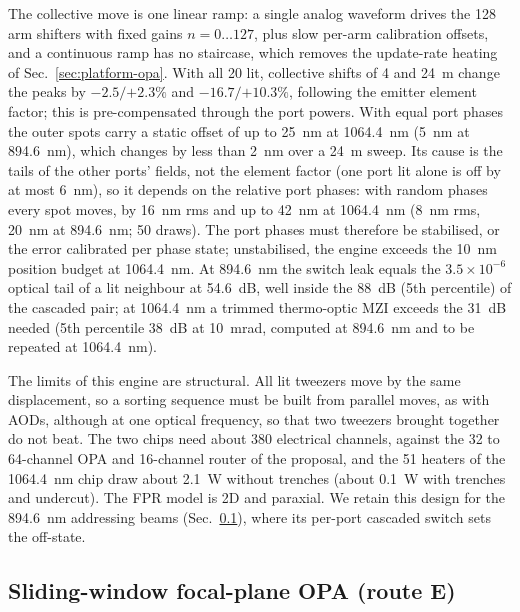 The collective move is one linear ramp: a single analog waveform drives the 128 arm shifters with fixed gains $n = 0\dots127$, plus slow per-arm calibration offsets, and a continuous ramp has no staircase, which removes the update-rate heating of Sec.~\ref{sec:platform-opa}. With all 20 lit, collective shifts of 4 and 24~\textmu m change the peaks by $-2.5/{+2.3}\%$ and $-16.7/{+10.3}\%$, following the emitter element factor; this is pre-compensated through the port powers. With equal port phases the outer spots carry a static offset of up to 25~nm at 1064.4~nm (5~nm at 894.6~nm), which changes by less than 2~nm over a 24~\textmu m sweep. Its cause is the tails of the other ports' fields, not the element factor (one port lit alone is off by at most 6~nm), so it depends on the relative port phases: with random phases every spot moves, by 16~nm rms and up to 42~nm at 1064.4~nm (8~nm rms, 20~nm at 894.6~nm; 50 draws). The port phases must therefore be stabilised, or the error calibrated per phase state; unstabilised, the engine exceeds the 10~nm position budget at 1064.4~nm. At 894.6~nm the switch leak equals the $3.5\times10^{-6}$ optical tail of a lit neighbour at 54.6~dB, well inside the 88~dB (5th percentile) of the cascaded pair; at 1064.4~nm a trimmed thermo-optic MZI exceeds the 31~dB needed (5th percentile 38~dB at 10~mrad, computed at 894.6~nm and to be repeated at 1064.4~nm).

The limits of this engine are structural. All lit tweezers move by the same displacement, so a sorting sequence must be built from parallel moves, as with AODs, although at one optical frequency, so that two tweezers brought together do not beat. The two chips need about 380 electrical channels, against the 32 to 64-channel OPA and 16-channel router of the proposal, and the 51 heaters of the 1064.4~nm chip draw about 2.1~W without trenches (about 0.1~W with trenches and undercut). The FPR model is 2D and paraxial. We retain this design for the 894.6~nm addressing beams (Sec.~\ref{sec:engine-E}), where its per-port cascaded switch sets the off-state.

\subsection{Sliding-window focal-plane OPA (route E)}\label{sec:engine-E}

